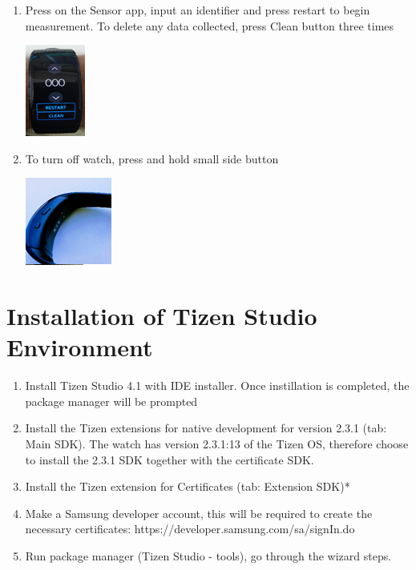 \documentclass[12pt, a4paper]{article}
\begin{document}
\begin{enumerate}
\begin{center}
\end{center}
  \item Press on the Sensor app, input an identifier and press restart to begin measurement. To delete any data collected, press Clean button three times  
    \begin{center}
    \includegraphics[width=.25\textwidth]{Pic 7.png}
\end{center}
  \item To turn off watch, press and hold small side button
    \begin{center}
    \includegraphics[width=.35\textwidth]{Pic 8.png}
\end{center}
\end{enumerate}
\cleardoublepage

\section{Installation of Tizen Studio Environment}

\begin{enumerate}
  \item Install Tizen Studio 4.1 with IDE installer. Once instillation is completed, the package manager will be prompted
  \item Install the Tizen extensions for native development for version 2.3.1 (tab: Main SDK). The watch has version 2.3.1:13 of the Tizen OS, therefore choose to install the 2.3.1 SDK together with the certificate SDK.
  \item Install the Tizen extension for Certificates (tab: Extension SDK)*
  \item Make a Samsung developer account, this will be required to create the necessary certificates: https://developer.samsung.com/sa/signIn.do 
  \item Run package manager (Tizen Studio - tools), go through the wizard steps.
\end{enumerate}
\end{document}
